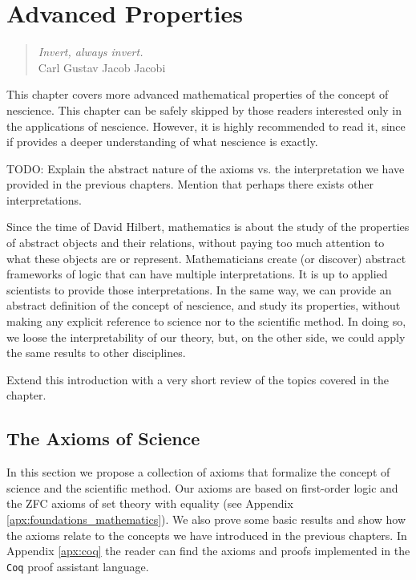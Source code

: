 %
%


\chapter{Advanced Properties}
\label{chap:Properties-Nescience}

\begin{quote}
\begin{flushright}
\emph{Invert, always invert.}\\
Carl Gustav Jacob Jacobi\\
\end{flushright}
\end{quote}
\bigskip

This chapter covers more advanced mathematical properties of the concept of nescience. This chapter can be safely skipped by those readers interested only in the applications of nescience. However, it is highly recommended to read it, since if provides a deeper understanding of what nescience is exactly.

{\color{red} TODO: Explain the abstract nature of the axioms vs. the interpretation we have provided in the previous chapters. Mention that perhaps there exists other interpretations.}

Since the time of David Hilbert, mathematics is about the study of the properties of abstract objects and their relations, without paying too much attention to what these objects are or represent. Mathematicians create (or discover) abstract frameworks of logic that can have multiple interpretations. It is up to applied scientists to provide those interpretations. In the same way, we can provide an abstract definition of the concept of nescience, and study its properties, without making any explicit reference to science nor to the scientific method. In doing so, we loose the interpretability of our theory, but, on the other side, we could apply the same results to other disciplines.

{\color{red} Extend this introduction with a very short review of the topics covered in the chapter.}

%
%

\section{The Axioms of Science}

In this section we propose a collection of axioms that formalize the concept of science and the scientific method. Our axioms are based on first-order logic and the ZFC axioms of set theory with equality (see Appendix \ref{apx:foundations_mathematics}). We also prove some basic results and show how the axioms relate to the concepts we have introduced in the previous chapters. In Appendix \ref{apx:coq} the reader can find the axioms and proofs implemented in the \texttt{Coq} proof assistant language.

